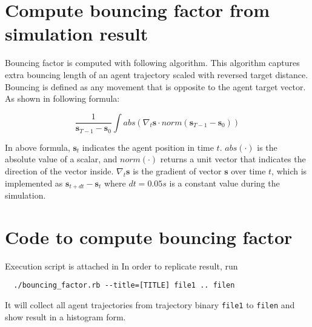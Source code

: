 \section{Compute bouncing factor from simulation result}

Bouncing factor is computed with following algorithm. This algorithm captures extra bouncing length of an agent 
trajectory scaled with reversed target distance. Bouncing is defined as any movement that is opposite to the agent 
target vector. As shown in following formula:

\begin{equation}
   \frac{1}{\mathbf{s}_{T-1}-\mathbf{s}_0} \int \mathit{abs} \left( \nabla_t\mathbf{s} \cdot \mathit{norm}\left( 
   {\mathbf{s}_{T-1}-\mathbf{s}_0} \right )\right )
\end{equation}

In above formula, \( \mathbf{s}_t \) indicates the agent position in time \( t \). \( \mathit{abs}(\cdot) \) is the 
absolute value of a scalar, and \( \mathit{norm}(\cdot) \) returns a unit vector that indicates the direction of the 
vector inside. \( \nabla_t\mathbf{s} \) is the gradient of vector \( \mathbf{s} \) over time \( t \), which is 
implemented as \( \mathbf{s}_{t+dt} - \mathbf{s}_{t} \) where \( dt = 0.05s \) is a constant value during the 
simulation.

\section{Code to compute bouncing factor}

Execution script is attached in 
In order to replicate result, run

\begin{verbatim}
  ./bouncing_factor.rb --title=[TITLE] file1 .. filen
\end{verbatim}

It will collect all agent trajectories from trajectory binary \texttt{file1} to \texttt{filen} and 
show result in a histogram form.

